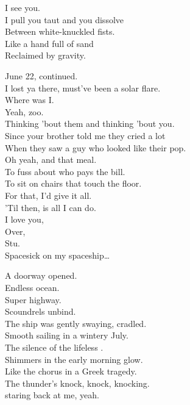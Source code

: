 I see you. \\
I pull you taut and you dissolve \\
Between white-knuckled fists. \\
Like a hand full of sand \\
Reclaimed by gravity. \\


June 22, continued. \\
I lost ya there, must've been a solar flare. \\
Where was I. \\
Yeah, zoo. \\
Thinking 'bout them and thinking 'bout you. \\
Since your brother told me they cried a lot \\
When they saw a guy who looked like their pop. \\
Oh yeah, and that meal. \\
To fuss about who pays the bill. \\
To sit on chairs that touch the floor. \\
For that, I'd give it all. \\
'Til then,  is all I can do. \\
I love you, \\
Over, \\
Stu. \\

Spacesick on my spaceship… \\





A doorway opened. \\
Endless ocean. \\
Super highway. \\
Scoundrels unbind. \\
The ship was gently swaying, cradled. \\
Smooth sailing in a wintery July. \\
The silence of the lifeless . \\
Shimmers in the early morning glow. \\
Like the chorus in a Greek tragedy. \\
The thunder's knock, knock, knocking. \\
 staring back at me, yeah. \\

